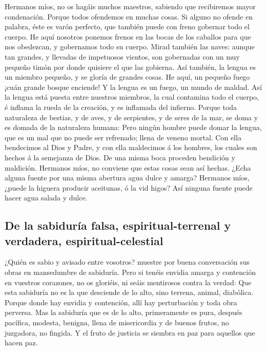  Hermanos míos, no os hagáis muchos maestros, sabiendo que
recibiremos mayor condenación.  Porque todos ofendemos en
muchas cosas. Si alguno no ofende en palabra, éste es varón perfecto,
que también puede con freno gobernar todo el cuerpo.  He
aquí nosotros ponemos frenos en las bocas de los caballos para que nos
obedezcan, y gobernamos todo su cuerpo.  Mirad también las
naves: aunque tan grandes, y llevadas de impetuosos vientos, son
gobernadas con un muy pequeño timón por donde quisiere el que las
gobierna.  Así también, la lengua es un miembro pequeño, y
se gloría de grandes cosas. He aquí, un pequeño fuego ¡cuán grande
bosque enciende!  Y la lengua es un fuego, un mundo de
maldad. Así la lengua está puesta entre nuestros miembros, la cual
contamina todo el cuerpo, é inflama la rueda de la creación, y es
inflamada del infierno.  Porque toda naturaleza de bestias,
y de aves, y de serpientes, y de seres de la mar, se doma y es domada de
la naturaleza humana:  Pero ningún hombre puede domar la
lengua, que es un mal que no puede ser refrenado; llena de veneno
mortal.  Con ella bendecimos al Dios y Padre, y con ella
maldecimos á los hombres, los cuales son hechos á la semejanza de Dios.
 De una misma boca proceden bendición y maldición. Hermanos
míos, no conviene que estas cosas sean así hechas.  ¿Echa
alguna fuente por una misma abertura agua dulce y amarga? 
Hermanos míos, ¿puede la higuera producir aceitunas, ó la vid higos? Así
ninguna fuente puede hacer agua salada y dulce.

\hypertarget{de-la-sabiduruxeda-falsa-espiritual-terrenal-y-verdadera-espiritual-celestial}{%
\subsection{De la sabiduría falsa, espiritual-terrenal y verdadera,
espiritual-celestial}\label{de-la-sabiduruxeda-falsa-espiritual-terrenal-y-verdadera-espiritual-celestial}}

 ¿Quién es sabio y avisado entre vosotros? muestre por
buena conversación sus obras en mansedumbre de sabiduría. 
Pero si tenéis envidia amarga y contención en vuestros corazones, no os
gloriéis, ni seáis mentirosos contra la verdad:  Que esta
sabiduría no es la que desciende de lo alto, sino terrena, animal,
diabólica.  Porque donde hay envidia y contención, allí hay
perturbación y toda obra perversa.  Mas la sabiduría que es
de lo alto, primeramente es pura, después pacífica, modesta, benigna,
llena de misericordia y de buenos frutos, no juzgadora, no fingida.
 Y el fruto de justicia se siembra en paz para aquellos que
hacen paz.

